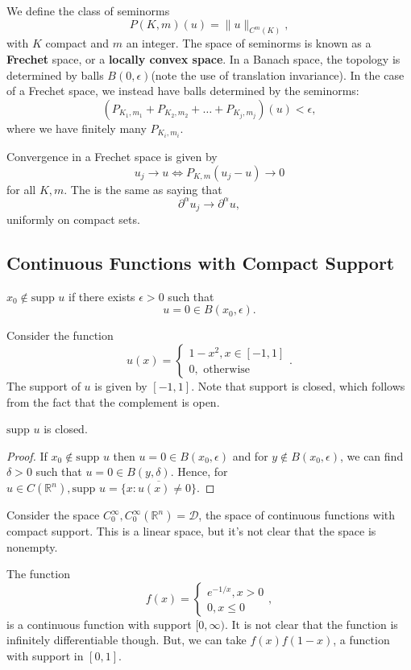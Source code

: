 \documentclass[11pt]{scrartcl}
\newcommand{\R}{\mathbb{R}}
\newcommand{\supp}{\text{supp }}
\begin{document}
We define the class of seminorms $$P(K, m)(u) = \|u \|_{C^m(K)},$$
with $K$ compact and $m$ an integer.  The space of seminorms is known as a \textbf{Frechet }space, or a \textbf{locally convex space}.  In a Banach space, the topology is determined by balls $B(0, \epsilon)$(note the use of translation invariance). In the case of a Frechet space, we instead have balls determined by the seminorms:
$$\left (P_{K_1, m_1} + P_{K_2, m_2} + \dots + P_{K_j, m_j}\right )(u) < \epsilon,$$
where we have finitely many $P_{K_i, m_i}$.  

Convergence in a Frechet space is given by 
$$u_j \rightarrow u \Leftrightarrow P_{K, m}(u_j - u) \rightarrow 0$$
for all $K, m$.  The is the same as saying that 
$$\partial^\alpha u_j \rightarrow \partial^\alpha u,$$
uniformly on compact sets.

\subsection{Continuous Functions with Compact Support}
\begin{definition} $x_0 \not \in \text{supp }u$ if there exists $\epsilon > 0$ such that 
$$u = 0 \in B(x_0, \epsilon).$$
\end{definition}
\begin{example}
Consider the function $$u(x) = \begin{cases} 1-x^2, x \in [-1, 1] \\ 0, \text{ otherwise}
\end{cases}.$$
The support of $u$ is given by $[-1, 1]$.  Note that support is closed, which follows from the fact that the complement is open.  
\end{example}
\begin{fact} $\supp u$ is closed.
\end{fact}
\begin{proof}If $x_0 \not \in \supp u$ then $u=0 \in B(x_0, \epsilon)$ and for $y \not \in B(x_0, \epsilon)$, we can find $\delta > 0$ such that $u = 0 \in B(y, \delta)$.  Hence, for $u \in C(\R^n), \supp u = \overline{\{x: u(x )\ne 0\}}.$
\end{proof}

Consider the space $C_0^\infty, C_0^{\infty}(\R^n) = \mathcal{D}$, the space of continuous functions with compact support.  This is a linear space, but it's not clear that the space is nonempty.

\begin{example} The function $$f(x) = \begin{cases} e^{-1/x}, x > 0 \\ 0, x \le 0 \end{cases},$$
is a continuous function with support $[0, \infty)$.  It is not clear that the function is infinitely differentiable though.  But, we can take $f(x)f(1-x)$, a function with support in $[0, 1]$.

\end{example}
\end{document}
